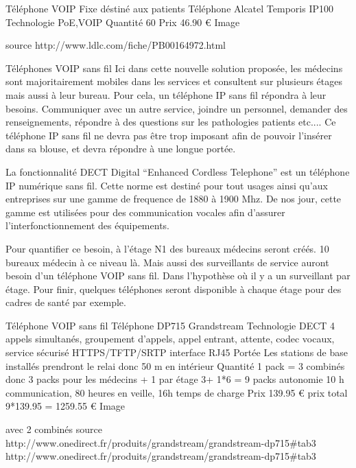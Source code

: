 Téléphone VOIP Fixe déstiné aux patients
    Téléphone
    Alcatel Temporis IP100
    Technologie
    PoE,VOIP
    Quantité
    60
    Prix
    46.90 €
    Image


    source
    http://www.ldlc.com/fiche/PB00164972.html










Téléphones VOIP sans fil
Ici dans cette nouvelle solution proposée, les médecins sont majoritairement mobiles dans les services et consultent sur plusieurs étages mais aussi à leur bureau. Pour cela, un téléphone IP sans fil répondra à leur besoins. Communiquer avec un autre service, joindre un personnel, demander des renseignements, répondre à des questions sur les pathologies patients etc....
Ce téléphone IP sans fil ne devra pas être trop imposant afin de pouvoir l’insérer dans sa blouse, et devra répondre à une longue portée.


La fonctionnalité DECT Digital “Enhanced Cordless Telephone” est un téléphone IP numérique sans fil. Cette norme est destiné pour tout usages ainsi qu’aux entreprises sur une gamme de frequence de 1880 à 1900 Mhz. De nos jour, cette gamme est utilisées pour des communication vocales afin d’assurer l'interfonctionnement des équipements.


Pour quantifier ce besoin, à l’étage N1 des bureaux médecins seront créés. 10 bureaux médecin à ce niveau là. Mais aussi des surveillants de service auront besoin d’un téléphone VOIP sans fil. Dans l’hypothèse où il y a un surveillant par étage. Pour finir, quelques téléphones seront disponible à chaque étage pour des cadres de santé par exemple.




Téléphone VOIP sans fil
    Téléphone
    DP715 Grandstream
    Technologie
    DECT 4 appels simultanés, groupement d’appels, appel entrant, attente, codec vocaux, service sécurisé HTTPS/TFTP/SRTP
interface RJ45
    Portée
    Les stations de base installés prendront le relai donc 50 m en intérieur
    Quantité
    1 pack = 3 combinés donc 3 packs pour les médecins + 1 par étage
3+ 1*6 = 9 packs
    autonomie
    10 h communication, 80 heures en veille, 16h temps de charge
    Prix
    139.95 € prix total 9*139.95 = 1259.55 €
    Image

 avec 2 combinés
    source
    http://www.onedirect.fr/produits/grandstream/grandstream-dp715#tab3
http://www.onedirect.fr/produits/grandstream/grandstream-dp715#tab3




